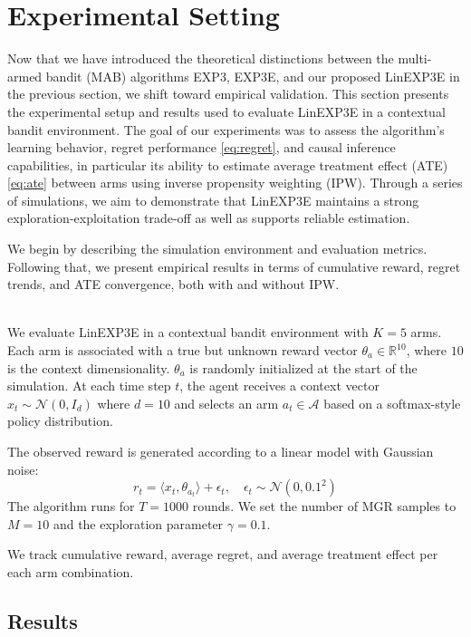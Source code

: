 
\section{Experimental Setting}\label{sec:experiments}

Now that we have introduced the theoretical distinctions between the multi-armed bandit (MAB) algorithms EXP3, EXP3E, and our proposed LinEXP3E in the previous section, we shift toward empirical validation. This section presents the experimental setup and results used to evaluate LinEXP3E in a contextual bandit environment. The goal of our experiments was to assess the algorithm's learning behavior, regret performance \ref{eq:regret}, and causal inference capabilities, in particular its ability to estimate average treatment effect (ATE) \ref{eq:ate} between arms using inverse propensity weighting (IPW). Through a series of simulations, we aim to demonstrate that LinEXP3E maintains a strong exploration-exploitation trade-off as well as supports reliable estimation.

We begin by describing the simulation environment and evaluation metrics. Following that, we present empirical results in terms of cumulative reward, regret trends, and ATE convergence, both with and without IPW.

\\
We evaluate LinEXP3E in a contextual bandit environment with $K = 5$ arms. Each arm is associated with a true but unknown reward vector $\theta_a \in \mathbb{R}^{10}$, where $10$ is the context dimensionality. $\theta_a$ is randomly initialized at the start of the simulation. At each time step $t$, the agent receives a context vector $x_t \sim \mathcal{N}(0, I_{d})$ where $d=10$ and selects an arm $a_t \in \mathcal{A}$ based on a softmax-style policy distribution.

The observed reward is generated according to a linear model with Gaussian noise:
\[
r_t = \langle x_t, \theta_{a_t} \rangle + \epsilon_t, \quad \epsilon_t \sim \mathcal{N}(0, 0.1^2)
\]
The algorithm runs for $T = 1000$ rounds. We set the number of MGR samples to $M = 10$ and the exploration parameter $\gamma = 0.1$.

We track cumulative reward, average regret, and average treatment effect per each arm combination. 

\subsection{Results}\label{subsec:results}

